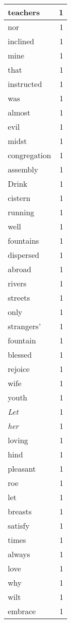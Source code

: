 \begin{center}
\begin{longtable}{l|r}
teachers & 1\\ \hline 
nor & 1\\ \hline 
inclined & 1\\ \hline 
mine & 1\\ \hline 
that & 1\\ \hline 
instructed & 1\\ \hline 
was & 1\\ \hline 
almost & 1\\ \hline 
evil & 1\\ \hline 
midst & 1\\ \hline 
congregation & 1\\ \hline 
assembly & 1\\ \hline 
Drink & 1\\ \hline 
cistern & 1\\ \hline 
running & 1\\ \hline 
well & 1\\ \hline 
fountains & 1\\ \hline 
dispersed & 1\\ \hline 
abroad & 1\\ \hline 
rivers & 1\\ \hline 
streets & 1\\ \hline 
only & 1\\ \hline 
strangers' & 1\\ \hline 
fountain & 1\\ \hline 
blessed & 1\\ \hline 
rejoice & 1\\ \hline 
wife & 1\\ \hline 
youth & 1\\ \hline 
\emph{Let} & 1\\ \hline 
\emph{her} & 1\\ \hline 
loving & 1\\ \hline 
hind & 1\\ \hline 
pleasant & 1\\ \hline 
roe & 1\\ \hline 
let & 1\\ \hline 
breasts & 1\\ \hline 
satisfy & 1\\ \hline 
times & 1\\ \hline 
always & 1\\ \hline 
love & 1\\ \hline 
why & 1\\ \hline 
wilt & 1\\ \hline 
embrace & 1\\ \hline 

\end{longtable}
\end{center}
